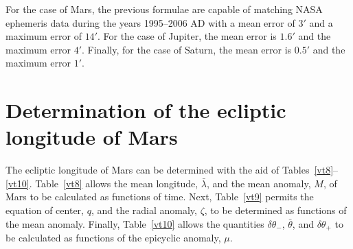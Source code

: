 For the case of Mars, the previous formulae are capable of matching NASA ephemeris data during the years 1995--2006 AD
with a mean error of $3'$ and a maximum error of $14'$. For the case of Jupiter, the mean error is
$1.6'$ and the maximum error $4'$. Finally, for the case of Saturn, the mean error is $0.5'$ and the
maximum error $1'$. 

\section{Determination of the ecliptic longitude of Mars}
The ecliptic longitude of Mars can be determined with the aid of Tables~\ref{vt8}--\ref{vt10}. Table~\ref{vt8} allows
the mean longitude, $\bar{\lambda}$, and the mean anomaly, $M$, of Mars to be calculated as functions of
time. Next, Table~\ref{vt9} permits the equation of center, $q$, and the radial anomaly, $\zeta$, to
be determined as functions of the mean anomaly. Finally, Table~\ref{vt10} allows the quantities
$\delta\theta_-$, $\bar{\theta}$, and $\delta\theta_+$ to be calculated as functions of the epicyclic
anomaly, $\mu$. 

